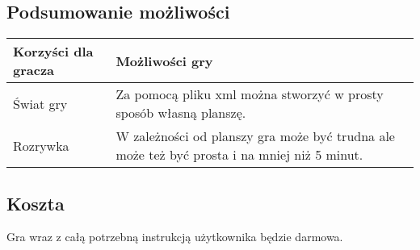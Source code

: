 \documentclass[12pt,a4paper,twoside]{article}
\begin{document}

\subsection{Podsumowanie możliwości}



\begin{center}

\begin{longtable}{|p{2.5in}|p{2.5in}|}
\hline
\bf Korzyści dla gracza & \bf Możliwości gry\\
\hline\endhead

Świat gry &
Za pomocą pliku xml można stworzyć w prosty sposób własną planszę.\\
\hline

Rozrywka &
W zależności od planszy gra może być trudna ale może też być prosta i na mniej niż 5 minut.\\
\hline

\end{longtable}
\end{center}

\subsection{Koszta}
Gra wraz z całą potrzebną instrukcją użytkownika będzie darmowa.

\end{document}
